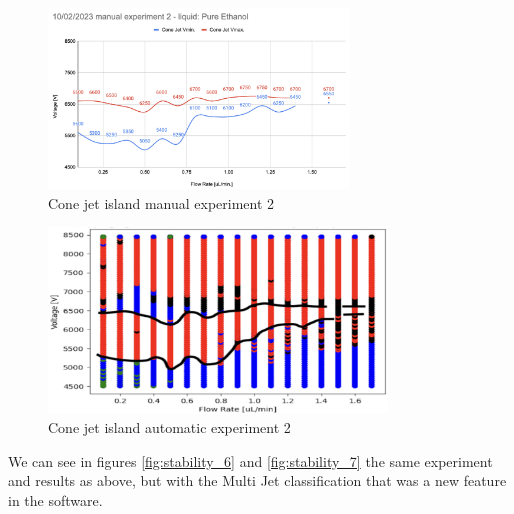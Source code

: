     \begin{multicols}{2}


        \begin{figure}[H]
            \center
            \includegraphics[width=8cm]{Figuras/april/results_map_1.png}
            \caption{Cone jet island manual experiment 2}
            \label{fig:stability_4}
        \end{figure}

        \begin{figure}[H]
            \center
            \includegraphics[width=9cm]{Figuras/april/results_map_2.png}
            \caption{Cone jet island automatic experiment 2}
            \label{fig:stability_5}
        \end{figure}

    \end{multicols}

    We can see in figures \ref{fig:stability_6} and \ref{fig:stability_7} the same experiment and results as above, but with the Multi Jet classification that was a new feature in the software.

